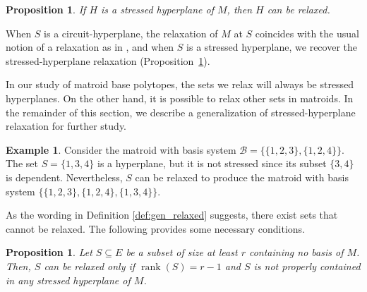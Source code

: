 \documentclass[11pt]{amsart}
\newtheorem{proposition}[theorem]{Proposition}
\theoremstyle{definition}
\newtheorem{example}[theorem]{Example}
\newcommand{\0}{\emptyset}
\newcommand{\B}{\mathcal{B}}
\DeclareMathOperator{\rank}{\operatorname{rank}}
\begin{document}
\begin{proposition}\label{prop:relaxation}\cite[Thm.~1.2]{relaxation}
If $H$ is a stressed hyperplane of $M$, then $H$ can be relaxed. 
\end{proposition}

When $S$ is a circuit-hyperplane, the relaxation of $M$ at $S$ coincides with the usual notion of a relaxation as in \cite[Section 1.5]{Oxley}, and when $S$ is a stressed hyperplane, we recover the stressed-hyperplane relaxation (Proposition~\ref{prop:relaxation}). 

In our study of matroid base polytopes, the sets we relax will always be stressed hyperplanes. 
On the other hand, it is possible to relax other sets in matroids.  
In the remainder of this section, we describe a generalization of stressed-hyperplane relaxation for further study.

\begin{example}\label{ex:gen_rel}
Consider the matroid with basis system $\B=\{\{1,2,3\},\{1,2,4\}\}$.
The set $S=\{1,3,4\}$ is a hyperplane, but it is not stressed since its subset $\{3,4\}$ is dependent.
Nevertheless, $S$ can be relaxed to produce the matroid with basis system $\{\{1,2,3\},\{1,2,4\},\{1,3,4\}\}$.
\end{example}

As the wording in Definition \ref{def:gen_relaxed} suggests, there exist sets that cannot be relaxed.
The following provides some necessary conditions.

\begin{proposition} \label{pillow}
Let $S \subseteq E$ be a subset of size at least $r$ containing no basis of $M$.
Then, $S$ can be relaxed only if $\rank(S)=r-1$ and $S$ is not properly contained in any stressed hyperplane of $M$.
\end{proposition}
\end{document}
